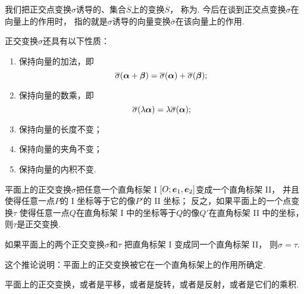 我们把正交点变换\(\sigma\)诱导的、集合\(\overline{S}\)上的变换\(\overline{S}\)，
称为.
今后在谈到正交点变换\(\sigma\)在向量上的作用时，
指的就是\(\sigma\)诱导的向量变换\(\overline{\sigma}\)在该向量上的作用.

\begin{property}
正交变换\(\sigma\)还具有以下性质：\begin{enumerate}
	\item 保持向量的加法，即\begin{equation*}
		\overline{\sigma}(\boldsymbol\alpha+\boldsymbol\beta)
		= \overline{\sigma}(\boldsymbol\alpha)
		+ \overline{\sigma}(\boldsymbol\beta);
	\end{equation*}

	\item 保持向量的数乘，即\begin{equation*}
		\overline{\sigma}(\lambda \boldsymbol\alpha)
		= \lambda \overline{\sigma}(\boldsymbol\alpha);
	\end{equation*}

	\item 保持向量的长度不变；

	\item 保持向量的夹角不变；

	\item 保持向量的内积不变.
\end{enumerate}
\end{property}

\begin{theorem}
平面上的正交变换\(\sigma\)把任意一个直角标架 I \([O;\boldsymbol{e}_1,\boldsymbol{e}_2]\)变成一个直角标架 II，
并且使得任意一点\(P\)的 I 坐标等于它的像\(P'\)的 II 坐标；
反之，如果平面上的一个点变换\(\tau\)
使得任意一点\(Q\)在直角标架 I 中的坐标等于\(Q\)的像\(Q'\)在直角标架 II 中的坐标，
则\(\tau\)是正交变换.
\end{theorem}

\begin{corollary}
如果平面上的两个正交变换\(\sigma\)和\(\tau\)
把直角标架 I 变成同一个直角标架 II，
则\(\sigma = \tau\).
\end{corollary}
\begin{remark}
这个推论说明：平面上的正交变换被它在一个直角标架上的作用所确定.
\end{remark}

\begin{theorem}
平面上的正交变换，或者是平移，或者是旋转，或者是反射，或者是它们的乘积.
\end{theorem}

